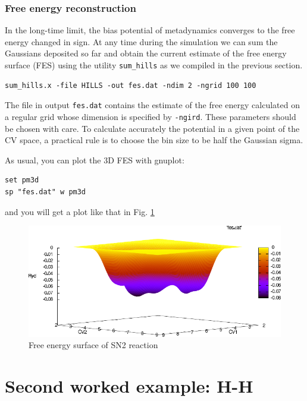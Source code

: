 \documentclass[12pt,a4paper]{article}
\begin{document}
\subsubsection{Free energy reconstruction}

In the long-time limit, the bias potential of metadynamics converges to the free energy changed in sign\cite{Bussi:2006gg}. At any time during the simulation we can sum the Gaussians deposited so far and obtain the current estimate of the free energy surface (FES) using the utility \texttt{sum\_hills} as we compiled in the previous section.

\begin{verbatim}
sum_hills.x -file HILLS -out fes.dat -ndim 2 -ngrid 100 100
\end{verbatim}

The file in output \texttt{fes.dat} contains the estimate of the free energy calculated on a regular grid whose dimension is specified by \texttt{-ngird}. These parameters should be chosen with care. To calculate accurately the potential in a given point of the CV space, a practical rule is to choose the bin size to be half the Gaussian sigma.

As usual, you can plot the 3D FES with gnuplot:

\begin{verbatim}
set pm3d
sp "fes.dat" w pm3d
\end{verbatim}

and you will get a plot like that in Fig. \ref{FIG_sn2_fes}

\begin{figure}[htbp]
\begin{center}
\includegraphics[width=\textwidth]{./pic/sn2_fes.pdf}
\caption{Free energy surface of SN2 reaction}
\label{FIG_sn2_fes}
\end{center}
\end{figure}

\section{Second worked example: H-H}
\end{document}
